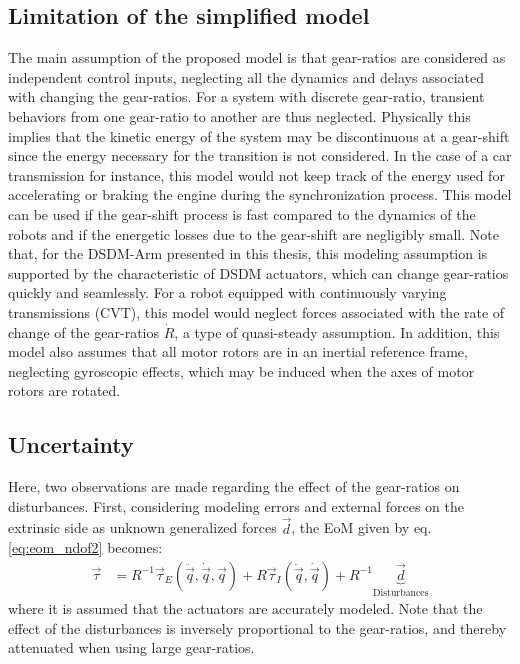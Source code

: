 \subsection{Limitation of the simplified model}
\label{sec:limitation}
%
The main assumption of the proposed model is that gear-ratios are considered as independent control inputs, neglecting all the dynamics and delays associated with changing the gear-ratios. For a system with discrete gear-ratio, transient behaviors from one gear-ratio to another are thus neglected. Physically this implies that the kinetic energy of the system may be discontinuous at a gear-shift since the energy necessary for the transition is not considered. In the case of a car transmission for instance, this model would not keep track of the energy used for accelerating or braking the engine during the synchronization process. This model can be used if the gear-shift process is fast compared to the dynamics of the robots and if the energetic losses due to the gear-shift are negligibly small. Note that, for the DSDM-Arm presented in this thesis, this modeling assumption is supported by the characteristic of DSDM actuators, which can change gear-ratios quickly and seamlessly. For a robot equipped with continuously varying transmissions (CVT), this model would neglect forces associated with the rate of change of the gear-ratios $\dot{R}$, a type of quasi-steady assumption. 
%
In addition, this model also assumes that all motor rotors are in an inertial reference frame, neglecting gyroscopic effects, which may be induced when the axes of motor rotors are rotated.

\subsection{Uncertainty}
\label{sec:uncertainty}

Here, two observations are made regarding the effect of the gear-ratios on disturbances. First, considering modeling errors and external forces on the extrinsic side as unknown generalized forces $\vec{d}$, the EoM given by eq. \eqref{eq:eom_ndof2} becomes:
\begin{align}
	\vec{\tau} &= R^{-1} 
	\vec{\tau}_{E}(\ddot{\vec{q}},\dot{\vec{q}},\vec{q}) 
	+ R 
	\vec{\tau}_{I}(\ddot{\vec{q}},\dot{\vec{q}})
    + R^{-1}
    \underbrace{ 
	\vec{d}
	}_{\text{Disturbances}}    
 \label{eq:eom_ndof3}
\end{align}
where it is assumed that the actuators are accurately modeled. Note that the effect of the disturbances is inversely proportional to the gear-ratios, and thereby attenuated when using large gear-ratios. 

